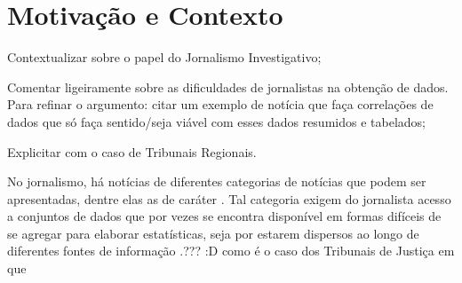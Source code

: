 \section{Motivação e Contexto}

\begin{todolist}
    \item Contextualizar sobre o papel do Jornalismo Investigativo;
    \item Comentar ligeiramente sobre as dificuldades de jornalistas na
          obtenção de dados. Para refinar o argumento: citar um exemplo de
          notícia que faça correlações de dados que só faça sentido/seja viável
          com esses dados resumidos e tabelados;
    \item Explicitar com o caso de Tribunais Regionais.
\end{todolist}

No jornalismo, há notícias de diferentes categorias de notícias que podem ser
apresentadas, dentre elas as de caráter
. Tal categoria exigem do jornalista acesso a conjuntos de dados que
por vezes se encontra disponível em formas difíceis de se agregar para elaborar
estatísticas, seja por estarem dispersos ao longo de diferentes fontes de
informação .??? :D como é o caso dos Tribunais de Justiça em que
